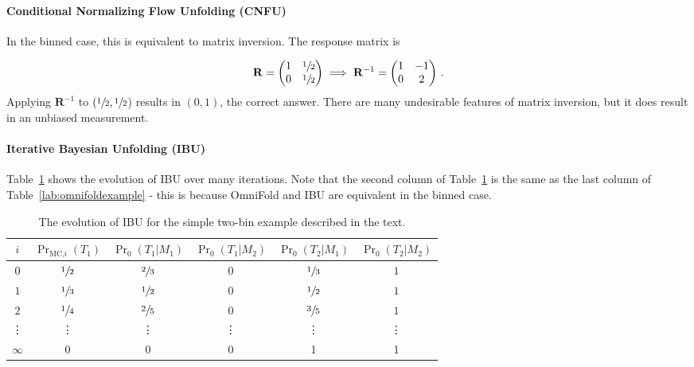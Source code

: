 \documentclass[NOTE, atlasdraft=true, texlive=2016, UKenglish]{\ATLASLATEXPATH atlasdoc}
\begin{document}
\paragraph{Conditional Normalizing Flow Unfolding (CNFU)} In the binned case, this is equivalent to matrix inversion.   The response matrix is

\begin{align}
\mathbf{R}=\begin{pmatrix} 1& \sfrac{1}{2}\cr 0 & \sfrac{1}{2}\end{pmatrix}\implies \mathbf{R}^{-1}=\begin{pmatrix} 1 & -1 \cr 0 & 2\end{pmatrix}\,.
\end{align}
%
Applying $\mathbf{R}^{-1}$ to $(\sfrac{1}{2},\sfrac{1}{2}$) results in $(0,1)$, the correct answer.  There are many undesirable features of matrix inversion, but it does result in an unbiased measurement.

\paragraph{Iterative Bayesian Unfolding (IBU)}

Table~\ref{lab:ibuexample} shows the evolution of IBU over many iterations.  Note that the second column of Table~\ref{lab:ibuexample} is the same as the last column of Table~\ref{lab:omnifoldexample} - this is because OmniFold and IBU are equivalent in the binned case.

\begin{table}[h!]
\centering
\begin{tabular}{|cccccc| }
\hline
$i$ & $\Pr_\text{MC,$i$}(T_1)$ & $\Pr_0(T_1|M_1)$ & $\Pr_0(T_1|M_2)$ & $\Pr_0(T_2|M_1)$ & $\Pr_0(T_2|M_2)$\\
\hline
$0$ & $\sfrac{1}{2}$ & $\sfrac{2}{3}$ & 0 & $\sfrac{1}{3}$ & $1$\\
$1$ & $\sfrac{1}{3}$ & $\sfrac{1}{2}$ & 0 & $\sfrac{1}{2}$ & $1$\\
$2$ & $\sfrac{1}{4}$ & $\sfrac{2}{5}$ & 0 & $\sfrac{3}{5}$ & $1$\\
\vdots & \vdots & \vdots & \vdots & \vdots & \vdots  \\
$\infty$ & 0 & 0 & 0 & 1 & 1\\
\hline
\end{tabular}
\caption{The evolution of IBU for the simple two-bin example described in the text.}
\label{lab:ibuexample}
\end{table}
\end{document}
